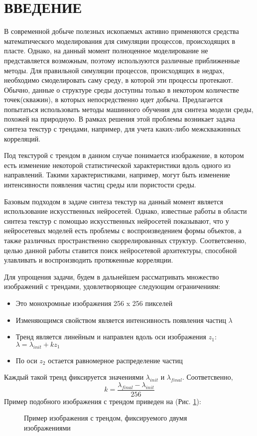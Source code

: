 \newpage
\section*{\hfil ВВЕДЕНИЕ \hfil}
	В современной добыче полезных ископаемых активно применяются средства математического моделирования для симуляции процессов, происходящих в пласте. Однако, на данный момент полноценное моделирование не представляется возможным, поэтому используются различные приближенные методы. Для правильной симуляции процессов, происходящих в недрах, необходимо смоделировать саму среду, в которой эти процессы протекают. Обычно, данные о структуре среды доступны только в некотором количестве точек(скважин), в которых непосредственно идет добыча. Предлагается попытаться использовать методы машинного обучения для синтеза модели среды, похожей на природную. В рамках решения этой проблемы возникает задача синтеза текстур с трендами, например, для учета каких-либо межскважинных корреляций. 
	
	Под текстурой с трендом в данном случае понимается изображение, в котором есть изменение некоторой статистической характеристики вдоль одного из направлений. Такими характеристиками, например, могут быть изменение интенсивности появления частиц среды или пористости среды.
	
	Базовым подходом в задаче синтеза текстур на данный момент является использование искусственных нейросетей. Однако, известные работы в области синтеза текстур с помощью искусственных нейросетей \cite{texture-synthesis-using-CNN, texture-networks} показывают, что у нейросетевых моделей есть проблемы с воспроизведением формы объектов, а также различных пространственно скоррелированных структур. Соответсвенно, целью данной работы ставится поиск нейросетевой архитектуры, способной улавливать и воспроизводить протяженные корреляции.
	
	Для упрощения задачи, будем в дальнейшем рассматривать множество изображений с трендами, удовлетворяющее следующим ограничениям:
	
	\begin{itemize}
		\item Это монохромные изображения 256 x 256 пикселей
		\item Изменяющимся свойством является интенсивность появления частиц $\lambda$
		\item Тренд является линейным и направлен вдоль оси изображения $z_1$: 
		$ \lambda = \lambda_{init} + k z_1 $
		\item По оси $z_2$ остается равномерное распределение частиц
	\end{itemize}
	
	Каждый такой тренд фиксируется значениями $\lambda_{init}$ и $\lambda_{final}$. Соответсвенно, 
	$$k = \frac{\lambda_{final} - \lambda_{init}}{256}$$
	Пример подобного изображения с трендом приведен на (Рис. \ref{1-trend-example}):
	
	\begin{figure}[h]
		\caption{Пример изображения с трендом, фиксируемого двумя изображениями}
		\label{1-trend-example}
	\end{figure}